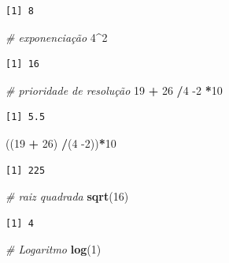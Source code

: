 \documentclass[12pt,brazil,oneside]{book}
\newenvironment{Shaded}{\begin{snugshade}}{\end{snugshade}}
\newcommand{\CommentTok}[1]{\textcolor[rgb]{0.56,0.35,0.01}{\textit{#1}}}
\newcommand{\DecValTok}[1]{\textcolor[rgb]{0.00,0.00,0.81}{#1}}
\newcommand{\KeywordTok}[1]{\textcolor[rgb]{0.13,0.29,0.53}{\textbf{#1}}}
\newcommand{\NormalTok}[1]{#1}
\newcommand{\OperatorTok}[1]{\textcolor[rgb]{0.81,0.36,0.00}{\textbf{#1}}}
\newcommand{\StringTok}[1]{\textcolor[rgb]{0.31,0.60,0.02}{#1}}
\begin{document}
\begin{verbatim}
[1] 8
\end{verbatim}

\begin{Shaded}
\begin{Highlighting}[]
\CommentTok{# exponenciação}
\DecValTok{4}\OperatorTok{^}\DecValTok{2}
\end{Highlighting}
\end{Shaded}

\begin{verbatim}
[1] 16
\end{verbatim}

\begin{Shaded}
\begin{Highlighting}[]
\CommentTok{# prioridade de resolução}
\DecValTok{19} \OperatorTok{+}\StringTok{ }\DecValTok{26} \OperatorTok{/}\DecValTok{4} \DecValTok{-2} \OperatorTok{*}\DecValTok{10}
\end{Highlighting}
\end{Shaded}

\begin{verbatim}
[1] 5.5
\end{verbatim}

\begin{Shaded}
\begin{Highlighting}[]
\NormalTok{((}\DecValTok{19} \OperatorTok{+}\StringTok{ }\DecValTok{26}\NormalTok{) }\OperatorTok{/}\NormalTok{(}\DecValTok{4} \DecValTok{-2}\NormalTok{))}\OperatorTok{*}\DecValTok{10}
\end{Highlighting}
\end{Shaded}

\begin{verbatim}
[1] 225
\end{verbatim}

\begin{Shaded}
\begin{Highlighting}[]
\CommentTok{# raiz quadrada}
\KeywordTok{sqrt}\NormalTok{(}\DecValTok{16}\NormalTok{)}
\end{Highlighting}
\end{Shaded}

\begin{verbatim}
[1] 4
\end{verbatim}

\begin{Shaded}
\begin{Highlighting}[]
\CommentTok{# Logaritmo }
\KeywordTok{log}\NormalTok{(}\DecValTok{1}\NormalTok{)}
\end{Highlighting}
\end{Shaded}
\end{document}
